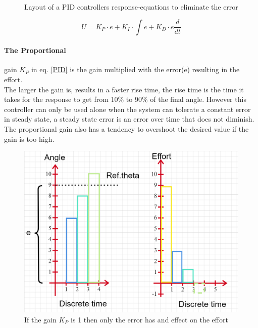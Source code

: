 \begin{figure} [H]
    \centering
    
    \caption{Layout of a PID controllers response-equations to eliminate the error}
    \label{fig:mPID}
\end{figure}


\begin{equation}\label{PID}
    U=K_P\cdot\textit{e}+K_I\cdot\int\textit{e}+K_D\cdot\textit{e} \frac{d}{dt}
\end{equation}

\paragraph{The Proportional} gain $K_P$ in eq. \ref{PID} is the gain multiplied with the error(e) resulting in the effort.\\
The larger the gain is, results in a faster rise time, the rise time is the time it takes for the response to get from 10\% to 90\% of the final angle. However this controller can only be used alone when the system can tolerate a constant error in steady state, a steady state error is an error over time that does not diminish. The proportional gain also has a tendency to overshoot the desired value if the gain is too high\cite{Control1DK}.\\

\begin{figure}[H]
    \centering
    \includegraphics[width=\textwidth]{Figures/Technical_figures/PGAIN.png} 
    \caption{If the gain $K_P$ is 1 then only the error has and effect on the effort}
    \label{fig:pGain}
\end{figure}

